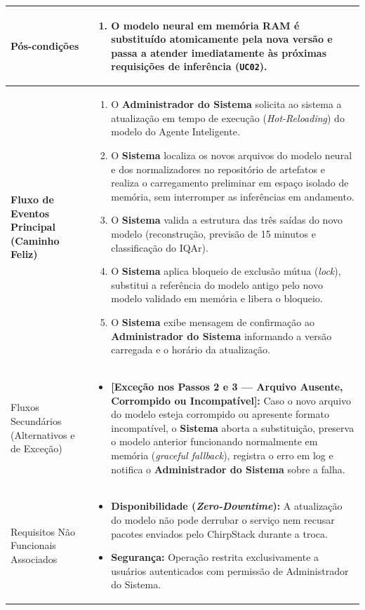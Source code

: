 \documentclass[11pt, a4paper]{article}
\begin{document}
\begin{longtable}{|>{\bfseries}p{3.8cm}|p{12.4cm}|}
Pós-condições & 
\begin{enumerate}[nosep, leftmargin=0.5cm]
    \item O modelo neural em memória RAM é substituído atomicamente pela nova versão e passa a atender imediatamente às próximas requisições de inferência (\texttt{UC02}).
\end{enumerate} \\ \hline

Fluxo de Eventos Principal (Caminho Feliz) & 
\begin{enumerate}[nosep, leftmargin=0.5cm]
    \item O \textbf{Administrador do Sistema} solicita ao sistema a atualização em tempo de execução (\emph{Hot-Reloading}) do modelo do Agente Inteligente.
    \item O \textbf{Sistema} localiza os novos arquivos do modelo neural e dos normalizadores no repositório de artefatos e realiza o carregamento preliminar em espaço isolado de memória, sem interromper as inferências em andamento.
    \item O \textbf{Sistema} valida a estrutura das três saídas do novo modelo (reconstrução, previsão de 15 minutos e classificação do IQAr).
    \item O \textbf{Sistema} aplica bloqueio de exclusão mútua (\emph{lock}), substitui a referência do modelo antigo pelo novo modelo validado em memória e libera o bloqueio.
    \item O \textbf{Sistema} exibe mensagem de confirmação ao \textbf{Administrador do Sistema} informando a versão carregada e o horário da atualização.
\end{enumerate} \\ \hline

Fluxos Secundários (Alternativos e de Exceção) & 
\begin{itemize}[nosep, leftmargin=0.5cm]
    \item \textbf{[Exceção nos Passos 2 e 3 --- Arquivo Ausente, Corrompido ou Incompatível]:} Caso o novo arquivo do modelo esteja corrompido ou apresente formato incompatível, o \textbf{Sistema} aborta a substituição, preserva o modelo anterior funcionando normalmente em memória (\emph{graceful fallback}), registra o erro em log e notifica o \textbf{Administrador do Sistema} sobre a falha.
\end{itemize} \\ \hline

Requisitos Não Funcionais Associados & 
\begin{itemize}[nosep, leftmargin=0.5cm]
    \item \textbf{Disponibilidade (\emph{Zero-Downtime}):} A atualização do modelo não pode derrubar o serviço nem recusar pacotes enviados pelo ChirpStack durante a troca.
    \item \textbf{Segurança:} Operação restrita exclusivamente a usuários autenticados com permissão de Administrador do Sistema.
\end{itemize} \\ \hline
\end{longtable}
\end{document}
